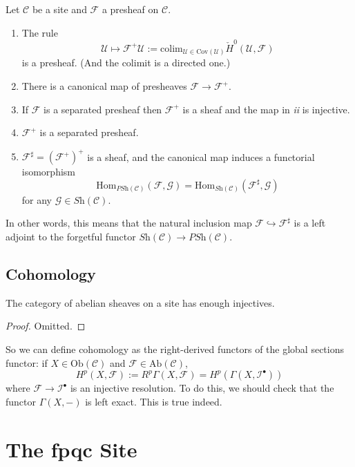 \begin{theorem}
Let $\mathcal{C}$ be a site and $\mathcal{F}$ a presheaf on $\mathcal{C}$.
\begin{enumerate}
\item The rule
$$
\mathcal{U} \mapsto \mathcal{F}^+ \mathcal{U} := \text{colim}_{\mathcal{U} \in \text{Cov}(\mathcal{U})} \check H^0(\mathcal{U}, \mathcal{F})
$$
is a presheaf. (And the colimit is a directed one.)
\item There is a canonical map of presheaves $\mathcal{F} \to \mathcal{F}^+$.
\item If $\mathcal{F}$ is a separated presheaf then $\mathcal{F}^+$ is a sheaf and the map in {\it ii} is injective.
\item $\mathcal{F}^+$ is a separated presheaf.
\item $\mathcal{F}^\sharp = (\mathcal{F}^+)^+$ is a sheaf, and the canonical map induces a functorial isomorphism
$$ 
\text{Hom}_{\textit{PSh}(\mathcal{C})}(\mathcal{F}, \mathcal{G}) = \text{Hom}_{\textit{Sh}(\mathcal{C})}(\mathcal{F}^\sharp,\mathcal{G})
$$ 
for any $\mathcal{G} \in \textit{Sh}(\mathcal{C})$.
\end{enumerate}
\end{theorem}

In other words, this means that the natural inclusion map $\mathcal{F} \hookrightarrow \mathcal{F}^\sharp$ is a left adjoint to the forgetful functor $\textit{Sh}(\mathcal{C}) \to \textit{PSh}(\mathcal{C})$.

\subsection{Cohomology}

\begin{theorem}
The category of abelian sheaves on a site has enough injectives.
\end{theorem}

\begin{proof}
Omitted.
\end{proof}

So we can define cohomology as the right-derived functors of the global sections functor: if $X \in \text{Ob}(\mathcal{C})$ and $\mathcal{F} \in \text{Ab}(\mathcal{C})$, 
$$
H^p(X,\mathcal{F}) := R^p \Gamma (X, \mathcal{F}) = H^p (\Gamma(X, \mathcal{I}^\bullet))
$$
where $\mathcal{F} \to \mathcal{I}^\bullet$ is an injective resolution. To do this, we should check that the functor $\Gamma (X, -)$ is left exact. This is true indeed. \section{The fpqc Site} %

